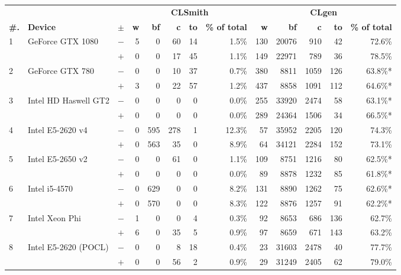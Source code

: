   \begin{tabular}{lll | rrrrr | rrrrr }
  \toprule
  & & & \multicolumn{5}{c|}{\textbf{CLSmith}} & \multicolumn{5}{c}{\textbf{CLgen}} \\
  \textbf{\#.} & \textbf{Device} & $\pm$ &
  \textbf{w} & \textbf{bf} & \textbf{c} & \textbf{to} & \textbf{\% of total} &
  \textbf{w} & \textbf{bf} & \textbf{c} & \textbf{to} & \textbf{\% of total} \\
  \midrule
  \multirow{ 2}{*}{1} & \multirow{ 2}{*}{GeForce GTX 1080} & $-$ & 5 & 0 & 60 & 14 & 1.5\%       & 130 & 20076 & 910 & 42 & 72.6\% \\& & $+$ & 0 & 0 & 17 & 45 & 1.1\% & 149 & 22971 & 789 & 36 & 78.5\% \\
\hline
\multirow{ 2}{*}{2} & \multirow{ 2}{*}{GeForce GTX 780} & $-$ & 0 & 0 & 10 & 37 & 0.7\%       & 380 & 8811 & 1059 & 126 & 63.8\%* \\& & $+$ & 3 & 0 & 22 & 57 & 1.2\% & 437 & 8858 & 1091 & 112 & 64.6\%* \\
\hline
\multirow{ 2}{*}{3} & \multirow{ 2}{*}{Intel HD Haswell GT2} & $-$ & 0 & 0 & 0 & 0 & 0.0\%       & 255 & 33920 & 2474 & 58 & 63.1\%* \\& & $+$ & 0 & 0 & 0 & 0 & 0.0\% & 289 & 24364 & 1506 & 34 & 66.5\%* \\
\hline
\multirow{ 2}{*}{4} & \multirow{ 2}{*}{Intel E5-2620 v4} & $-$ & 0 & 595 & 278 & 1 & 12.3\%       & 57 & 35952 & 2205 & 120 & 74.3\% \\& & $+$ & 0 & 563 & 35 & 0 & 8.9\% & 64 & 34121 & 2284 & 152 & 73.1\% \\
\hline
\multirow{ 2}{*}{5} & \multirow{ 2}{*}{Intel E5-2650 v2} & $-$ & 0 & 0 & 61 & 0 & 1.1\%       & 109 & 8751 & 1216 & 80 & 62.5\%* \\& & $+$ & 0 & 0 & 0 & 0 & 0.0\% & 89 & 8878 & 1232 & 85 & 61.8\%* \\
\hline
\multirow{ 2}{*}{6} & \multirow{ 2}{*}{Intel i5-4570} & $-$ & 0 & 629 & 0 & 0 & 8.2\%       & 131 & 8890 & 1262 & 75 & 62.6\%* \\& & $+$ & 0 & 570 & 0 & 0 & 8.3\% & 122 & 8876 & 1257 & 91 & 62.2\%* \\
\hline
\multirow{ 2}{*}{7} & \multirow{ 2}{*}{Intel Xeon Phi} & $-$ & 1 & 0 & 0 & 4 & 0.3\%       & 92 & 8653 & 686 & 136 & 62.7\% \\& & $+$ & 6 & 0 & 35 & 5 & 0.9\% & 97 & 8659 & 671 & 143 & 63.2\% \\
\hline
\multirow{ 2}{*}{8} & \multirow{ 2}{*}{Intel E5-2620 (POCL)} & $-$ & 0 & 0 & 8 & 18 & 0.4\%       & 23 & 31603 & 2478 & 40 & 77.7\% \\& & $+$ & 0 & 0 & 56 & 2 & 0.9\% & 29 & 31249 & 2405 & 62 & 79.0\% \\

\end{tabular}
